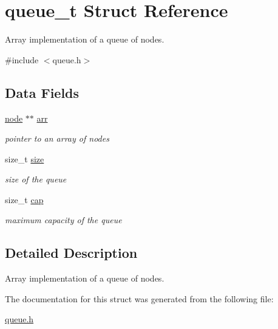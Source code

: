 \hypertarget{structqueue__t}{}\section{queue\+\_\+t Struct Reference}
\label{structqueue__t}


Array implementation of a queue of nodes.  




{\ttfamily \#include $<$queue.\+h$>$}

\subsection*{Data Fields}
\begin{DoxyCompactItemize}
\item 
\hypertarget{structqueue__t_ae332a245e06417717ef1ad4a86d4e809}{}\hyperlink{node_8h_a1c1c4438956188a85fe68f77f997b9e0}{node} $\ast$$\ast$ \hyperlink{structqueue__t_ae332a245e06417717ef1ad4a86d4e809}{arr}\label{structqueue__t_ae332a245e06417717ef1ad4a86d4e809}

\begin{DoxyCompactList}\small\item\em pointer to an array of nodes \end{DoxyCompactList}\item 
\hypertarget{structqueue__t_a83a13b888f9d4ef127d706559818b779}{}size\+\_\+t \hyperlink{structqueue__t_a83a13b888f9d4ef127d706559818b779}{size}\label{structqueue__t_a83a13b888f9d4ef127d706559818b779}

\begin{DoxyCompactList}\small\item\em size of the queue \end{DoxyCompactList}\item 
\hypertarget{structqueue__t_a5bef0472d958627890767949d1c5d6cd}{}size\+\_\+t \hyperlink{structqueue__t_a5bef0472d958627890767949d1c5d6cd}{cap}\label{structqueue__t_a5bef0472d958627890767949d1c5d6cd}

\begin{DoxyCompactList}\small\item\em maximum capacity of the queue \end{DoxyCompactList}\end{DoxyCompactItemize}


\subsection{Detailed Description}
Array implementation of a queue of nodes. 

The documentation for this struct was generated from the following file\+:\begin{DoxyCompactItemize}
\item 
\hyperlink{queue_8h}{queue.\+h}\end{DoxyCompactItemize}
